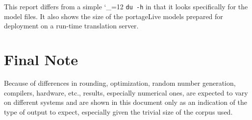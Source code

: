\documentclass[11pt,letterpaper]{article}
\def\code{\begingroup\catcode`\_=12 \codex}
\newcommand{\codex}[1]{\texttt{#1}\endgroup}
\begin{document}
This report differs from a simple \code{du -h} in that it looks specifically
for the model files. It also shows the size of the portageLive models prepared
for deployment on a run-time translation server.

\section*{Final Note}
Because of differences in rounding, optimization, random number generation,
compilers, hardware, etc., results, especially numerical ones, are expected to
vary on different systems and are shown in this document only as an indication
of the type of output to expect, especially given the trivial size of the
corpus used.
\end{document}
